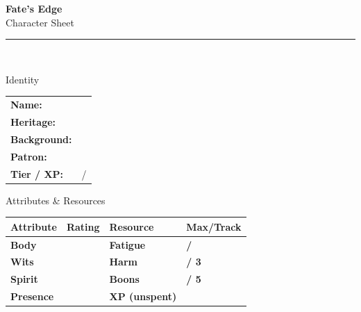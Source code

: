 \documentclass[10pt]{article}
\begin{document}

\begin{center}
    {\Huge\bfseries\sffamily\color{edgered} Fate's Edge}\\[0.2em]
    {\large\sffamily Character Sheet}\\[0.5em]
    \rule{0.5\textwidth}{0.5pt}\\[1em]
\end{center}

\begin{minipage}[t]{0.48\linewidth}
    \begin{charbox}{Identity}
        \begin{tabular}{p{2.5cm} p{5cm}}
            \textbf{Name:} & \underline{\hspace{4cm}} \\
            \textbf{Heritage:} & \underline{\hspace{4cm}} \\
            \textbf{Background:} & \underline{\hspace{4cm}} \\
            \textbf{Patron:} & \underline{\hspace{4cm}} \\
            \textbf{Tier / XP:} & \underline{\hspace{2cm}} / \underline{\hspace{2cm}} \\
        \end{tabular}
    \end{charbox}
    
    \vspace{0.5em}
    
    \begin{charbox}{Attributes \& Resources}
        \begin{tabular}{>{\bfseries}p{2.5cm} >{\bfseries}p{1.5cm} >{\bfseries}p{2.5cm} >{\bfseries}p{1.5cm}}
            \toprule
            \textbf{Attribute} & \textbf{Rating} & \textbf{Resource} & \textbf{Max/Track} \\
            \midrule
            Body & \underline{\hspace{1.5cm}} & Fatigue & \underline{\hspace{1.5cm}} / \underline{\hspace{1.5cm}} \\
            Wits & \underline{\hspace{1.5cm}} & Harm & \underline{\hspace{1.5cm}} / 3 \\
            Spirit & \underline{\hspace{1.5cm}} & Boons & \underline{\hspace{1.5cm}} / 5 \\
            Presence & \underline{\hspace{1.5cm}} & XP (unspent) & \underline{\hspace{1.5cm}} \\
            \bottomrule
        \end{tabular}
    \end{charbox}
    

\end{minipage}
\end{document}
